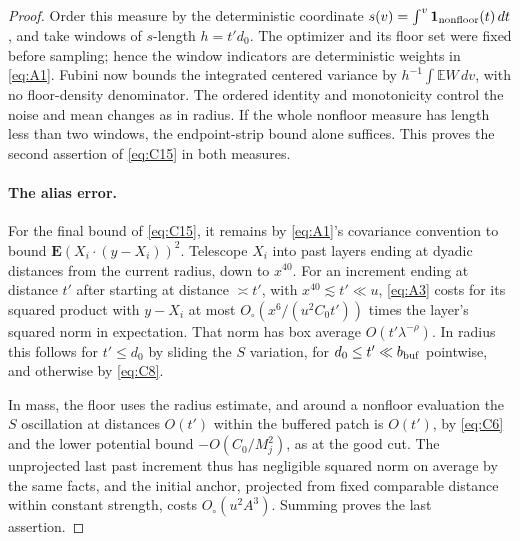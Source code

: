 \begin{proof}
Order this measure by the deterministic coordinate
\(s(v)=\int^v\mathbf1_{\rm nonfloor}(t)\,dt\), and take windows
of \(s\)-length \(h=t'd_0\). The optimizer and its floor set were
fixed before sampling; hence the window indicators are deterministic
weights in \eqref{eq:A1}. Fubini now bounds the integrated centered
variance by \(h^{-1}\int\mathbb EW\,dv\), with no floor-density
denominator. The ordered identity and monotonicity control the noise
and mean changes as in radius. If the whole nonfloor measure has length
less than two windows, the endpoint-strip bound alone suffices. This
proves the second assertion of \eqref{eq:C15} in both measures.


\paragraph{The alias error.}

For the final bound of \eqref{eq:C15}, it remains by \eqref{eq:A1}'s covariance convention to bound \(\mathbf E(X_i\cdot(y-X_i))^2\). Telescope \(X_i\) into past layers ending at dyadic distances from the current radius, down to \(x^{40}\). For an increment ending at distance \(t'\) after starting at distance \(\asymp t'\), with \(x^{40}\lesssim t'\ll u\), \eqref{eq:A3} costs for its squared product with \(y-X_i\) at most \(O_\circ(x^6/(u^2 C_0 t'))\) times the layer's squared norm in expectation. That norm has box average \(O(t'\lambda^{-\rho})\). In radius this follows for \(t'\le d_0\) by sliding the \(S\) variation, for \(d_0\le t'\ll b_{\rm buf}\) pointwise, and otherwise by \eqref{eq:C8}.

In mass, the floor uses the radius estimate, and around a nonfloor evaluation the \(S\) oscillation at distances \(O(t')\) within the buffered patch is \(O(t')\), by \eqref{eq:C6} and the lower potential bound \(-O(C_0/M_j^2)\), as at the good cut. The unprojected last past increment thus has negligible squared norm on average by the same facts, and the initial anchor, projected from fixed comparable distance within constant strength, costs \(O_\circ(u^2 A^3)\). Summing proves the last assertion.

\end{proof}


